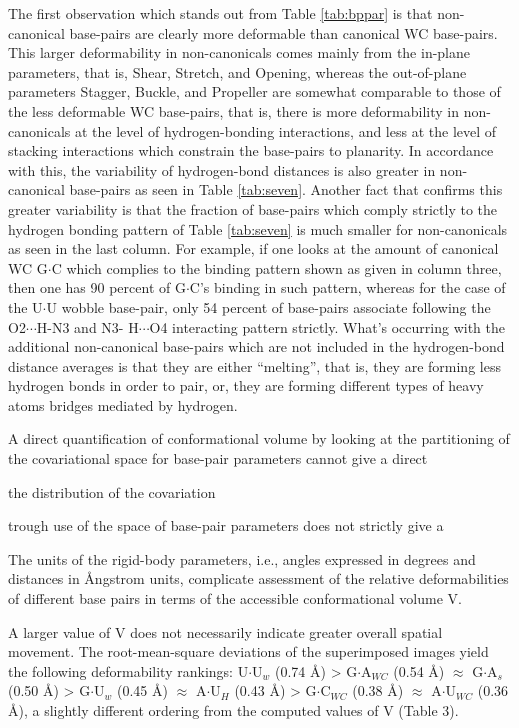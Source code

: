 The first  observation which stands out from  Table \ref{tab:bppar} is
that  non-canonical  base-pairs   are  clearly  more  deformable  than
canonical WC base-pairs.   This larger deformability in non-canonicals
comes mainly  from the in-plane  parameters, that is,  Shear, Stretch,
and Opening, whereas the  out-of-plane parameters Stagger, Buckle, and
Propeller are somewhat  comparable to those of the  less deformable WC
base-pairs, that is, there  is more deformability in non-canonicals at
the level of  hydrogen-bonding interactions, and less at  the level of
stacking interactions which constrain  the base-pairs to planarity. In
accordance with  this, the  variability of hydrogen-bond  distances is
also   greater  in   non-canonical   base-pairs  as   seen  in   Table
\ref{tab:seven}. Another  fact that confirms  this greater variability
is  that the  fraction  of  base-pairs which  comply  strictly to  the
hydrogen bonding pattern of  Table \ref{tab:seven} is much smaller for
non-canonicals as seen  in the last column. For  example, if one looks
at the amount of canonical  WC G$\cdot$C which complies to the binding
pattern shown  as given in  column three, then  one has 90  percent of
G$\cdot$C's  binding in  such pattern,  whereas  for the  case of  the
U$\cdot$U wobble  base-pair, only  54 percent of  base-pairs associate
following the  O2$\cdots$H-N3 and N3-  H$\cdots$O4 interacting pattern
strictly.    What's  occurring   with  the   additional  non-canonical
base-pairs  which  are  not  included in  the  hydrogen-bond  distance
averages  is that  they  are  either ``melting'',  that  is, they  are
forming less  hydrogen bonds  in order to  pair, or, they  are forming
different types of heavy atoms bridges mediated by hydrogen.


A direct
quantification of conformational volume by looking at the partitioning
of  the covariational  space for  base-pair parameters  cannot  give a
direct 

the distribution
of the covariation 


trough use  of  the space  of
base-pair parameters does not strictly give a 


The  units  of  the  rigid-body  parameters,  i.e.,  angles
expressed  in  degrees and  distances  in  Ångstrom units,  complicate
assessment of the relative  deformabilities of different base pairs in
terms of the  accessible conformational volume V.

A  larger value of V
does not  necessarily indicate  greater overall spatial  movement. The
root-mean-square  deviations  of  the  superimposed images  yield  the
following  deformability   rankings:  U$\cdot$U$_{w}$  (0.74   \AA)  >
G$\cdot$A$_{WC}$  (0.54 \AA)  $\approx$ G$\cdot$A$_{s}$  (0.50  \AA) >
G$\cdot$U$_{w}$  (0.45  \AA) $\approx$  A$\cdot$U$_{H}$  (0.43 \AA)  >
G$\cdot$C$_{WC}$ (0.38  \AA) $\approx$ A$\cdot$U$_{WC}$  (0.36 \AA), a
slightly  different ordering  from  the computed  values  of V  (Table
3).

